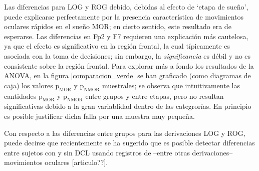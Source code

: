 Las diferencias para LOG y ROG debido, debidas al efecto de `etapa de sueño', puede explicarse perfectamente por la presencia característica de movimientos oculares rápidos en el sueño MOR; en cierto sentido, este resultado era de esperarse.
%
Las diferencias en Fp2 y F7 requieren una explicación más cautelosa, ya que el efecto es significativo en la región frontal, la cual típicamente es asociada con la toma de decisiones; sin embargo, la \textit{significancia} es débil y no es consistente sobre la región frontal.
%
Para explorar más a fondo los resultados de la ANOVA, en la figura \ref{comparacion_verde} se han graficado (como diagramas de caja) los valores $\text{p}_{\text{MOR}}$ y $\text{p}_{\text{NMOR}}$ muestrales; se observa que intuitivamente las cantidades $\text{p}_{\text{MOR}}$ y $\text{p}_{\text{NMOR}}$ entre grupos y entre etapas, pero no resultan significativas debido a la gran variablidad dentro de las categrorías.
%
En principio es posible justificar dicha falla por una muestra muy pequeña.

Con respecto a las diferencias entre grupos para las derivaciones LOG y ROG, puede decirse que recientemente se ha sugerido que es posible detectar diferencias entre sujetos con y sin DCL usando registros de --entre otras derivaciones-- movimientos oculares [articulo??].

